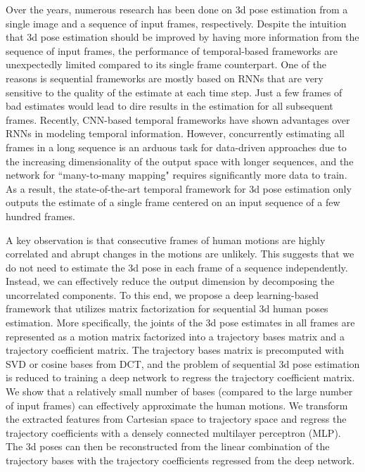 \documentclass{bmvc2k}
\begin{document}
Over the years, numerous research has been done on 3d pose estimation from a single image and a sequence of input frames, respectively. 
Despite the intuition that 3d pose estimation should be improved by having more information from the sequence of input frames, the performance of temporal-based frameworks are unexpectedly limited compared to its single frame counterpart. One of the reasons is sequential frameworks are mostly based on RNNs \cite{hossain2018exploiting, lin2017recurrent, lee2018propagating} that are very sensitive to the quality of the estimate at each time step. Just a few frames of bad estimates would lead to dire results in the estimation for all subsequent frames. 
Recently, CNN-based temporal frameworks \cite{collobert2016wav2letter, dauphin2017language, gehring2017convolutional, van2016wavenet} have shown advantages over RNNs in modeling temporal information. However, concurrently estimating all frames in a long sequence is an arduous task for data-driven approaches due to the increasing dimensionality of the output space with longer sequences, and the network for ``many-to-many mapping" requires significantly more data to train. As a result, the state-of-the-art temporal framework for 3d pose estimation \cite{pavllo20183d} only outputs the estimate of a single frame centered on an input sequence of a few hundred frames.

A key observation is that consecutive frames of human motions are highly correlated and abrupt changes in the motions are unlikely. This suggests that we do not need to estimate the 3d pose in each frame of a sequence independently. Instead, we can effectively reduce the output dimension by decomposing the uncorrelated components. To this end, we propose a deep learning-based framework that utilizes matrix factorization \cite{tomasi1992shape, bregler2000recovering, akhter2009nonrigid} for sequential 3d human poses estimation.
More specifically, the joints of the 3d pose estimates in all frames are represented as a motion matrix factorized into a trajectory bases matrix and a trajectory coefficient matrix. The trajectory bases matrix is precomputed with 
SVD or cosine bases from DCT, and the problem of sequential 3d pose estimation is reduced to training a deep network to regress the trajectory coefficient matrix. 
We show that a relatively small number of bases (compared to the large number of input frames) can effectively approximate the human motions.
We transform the extracted features from Cartesian space to trajectory space and regress the trajectory coefficients with a densely connected multilayer perceptron (MLP). The 3d poses can then be reconstructed from the linear combination of the trajectory bases with the trajectory coefficients regressed from the deep network.
\end{document}
